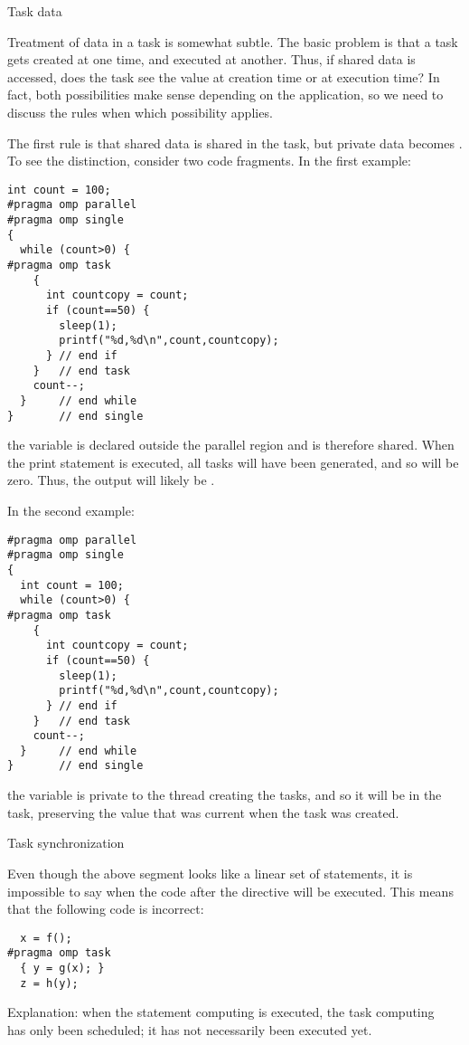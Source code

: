  {Task data}

Treatment of data in a task is somewhat subtle. The basic problem is
that a task gets created at one time, and executed at another. Thus,
if shared data is accessed, does the task see the value at creation
time or at execution time? In fact, both possibilities make sense
depending on the application, so we need to discuss the rules when
which possibility applies.

The first rule is that shared data is shared in the task, but private
data becomes . To see the distinction, consider two
code fragments. In the first example:
\begin{verbatim}
int count = 100;
#pragma omp parallel
#pragma omp single
{
  while (count>0) {
#pragma omp task
    {
      int countcopy = count;
      if (count==50) {
        sleep(1);
        printf("%d,%d\n",count,countcopy);
      } // end if
    }   // end task
    count--;
  }     // end while
}       // end single
\end{verbatim}
the variable  is declared outside the
parallel region and is therefore shared. When the print statement is
executed, all tasks will have been generated, and so  will be
zero. Thus, the output will likely be .

In the second example:
\begin{verbatim}
#pragma omp parallel
#pragma omp single
{
  int count = 100;
  while (count>0) {
#pragma omp task
    {
      int countcopy = count;
      if (count==50) {
        sleep(1);
        printf("%d,%d\n",count,countcopy);
      } // end if
    }   // end task
    count--;
  }     // end while
}       // end single
\end{verbatim}
the  variable is private to the thread creating the tasks,
and so it will be  in the task, preserving the value
that was current when the task was created.


 {Task synchronization}

Even though the above segment looks like a linear set of statements,
it is impossible to say when
the code after the  directive will be executed.
This means that the following code is incorrect:
\begin{verbatim}
  x = f();
#pragma omp task
  { y = g(x); }
  z = h(y);  
\end{verbatim}
Explanation: when the statement computing  is executed, the task
computing~ has only been scheduled;
it has not necessarily been executed yet.

